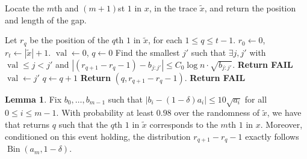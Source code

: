 \documentclass[12pt]{article}
\theoremstyle{definition}
\newtheorem{lemma}[theorem]{Lemma}
\theoremstyle{remark}
\DeclareMathOperator{\Bin}{Bin}
\DeclareMathOperator{\val}{val}
\begin{document}
\begin{algorithm}
\caption{Locate the $m$th and $(m+1)$st $1$ in $x$, in the trace $\tilde{x}$, and return the position and length of the gap.}
\label{alg:findmthone}
\begin{algorithmic}[1]
\State Let $r_q$ be the position of the $q$th $1$ in $\tilde{x}$, for each $1 \le q \le t-1$.
\State $r_0 \leftarrow 0$, $r_t \leftarrow |\tilde{x}|+1$.
\State $\val \leftarrow 0$, $q \leftarrow 0$
\While{$\val < m$}
    \State Find the smallest $j'$ such that $\exists j, j'$ with $\val \le j < j'$ and $|(r_{q+1}-r_{q}-1) - b_{j:j'}| \le C_0 \log n \cdot \sqrt{b_{j:j'}}.$
        \State \textbf{Return FAIL}
    \EndIf
    \State $\val \leftarrow j'$
    \State $q \leftarrow q + 1$
    \EndWhile
\If{$\val = m$}
    \State \textbf{Return} $(q, r_{q+1}-r_{q}-1)$.
\Else
    \State \textbf{Return FAIL}
\EndIf
\EndProcedure
\end{algorithmic}
\end{algorithm}

\begin{lemma} \label{lem:crude-main-analysis}
    Fix $b_0, \dots, b_{m-1}$ such that $|b_i-(1-\delta) a_i| \le 10 \sqrt{a_i}$ for all $0 \le i \le m-1$. With probability at least $0.98$ over the randomness of $\tilde{x}$, we have that  returns $q$ such that the $q$th $1$ in $\tilde{x}$ corresponds to the $m$th $1$ in $x$. Moreover, conditioned on this event holding, the distribution $r_{q+1}-r_q-1$ exactly follows $\Bin(a_m, 1-\delta)$.
\end{lemma}
\end{document}
